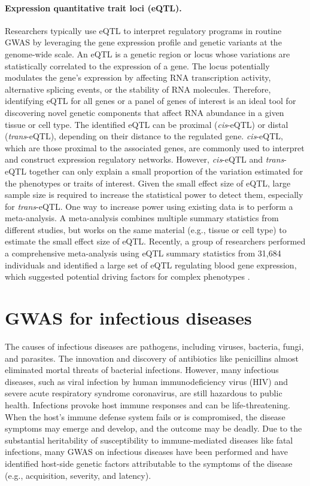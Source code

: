 \documentclass{book}
\begin{document}
\begin{refsection}
\paragraph*{Expression quantitative trait loci (eQTL).} Researchers typically use eQTL to interpret regulatory programs in routine GWAS by leveraging the gene expression profile and genetic variants at the genome-wide scale.
An eQTL is a genetic region or locus whose variations are statistically correlated to the expression of a gene.
The locus potentially modulates the gene’s expression by affecting RNA transcription activity, alternative splicing events, or the stability of RNA molecules.
Therefore, identifying eQTL for all genes or a panel of genes of interest is an ideal tool for discovering novel genetic components that affect RNA abundance in a given tissue or cell type.%
The identified eQTL can be proximal (\textit{cis}-eQTL) or distal (\textit{trans}-eQTL), depending on their distance to the regulated gene.
\textit{cis}-eQTL, which are those proximal to the associated genes, are commonly used to interpret and construct expression regulatory networks.
However, \textit{cis}-eQTL and \textit{trans}-eQTL together can only explain a small proportion of the variation estimated for the phenotypes or traits of interest. %
Given the small effect size of eQTL, large sample size is required to increase the statistical power to detect them, especially for \textit{trans}-eQTL.
One way to increase power using existing data is to perform a meta-analysis.
A meta-analysis combines multiple summary statistics from different studies, but works on the same material (e.g., tissue or cell type) to estimate the small effect size of eQTL.
Recently, a group of researchers performed a comprehensive meta-analysis using eQTL summary statistics from 31,684 individuals and identified a large set of eQTL regulating blood gene expression, which suggested potential driving factors for complex phenotypes \cite{Võsa2021Large}.

\section*{GWAS for infectious diseases}
The causes of infectious diseases are pathogens, including viruses, bacteria, fungi, and parasites.
The innovation and discovery of antibiotics like penicillins almost eliminated mortal threats of bacterial infections.
However, many infectious diseases, such as viral infection by human immunodeficiency virus (HIV) and severe acute respiratory syndrome coronavirus, are still hazardous to public health.
Infections provoke host immune responses and can be life-threatening.
When the host's immune defense system fails or is compromised, the disease symptoms may emerge and develop, and the outcome may be deadly.
Due to the substantial heritability of susceptibility to immune-mediated diseases like fatal infections, many GWAS on infectious diseases have been performed and have identified host-side genetic factors attributable to the symptoms of the disease (e.g., acquisition, severity, and latency).


\end{refsection}
\end{document}
